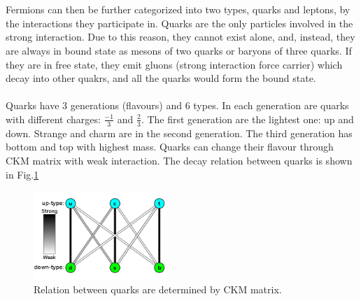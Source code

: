 \\ 
\\Fermions can then be further categorized into two types, quarks and leptons, by the interactions they participate in. Quarks are the only particles involved in the strong interaction. Due to this reason, they cannot exist alone, and, instead, they are always in bound state as mesons of two quarks or baryons of three quarks. If they are in free state, they emit gluons (strong interaction force carrier) which  decay into other quakrs, and all the quarks would form the bound state. 
\\
\\Quarks have 3 generations (flavours) and 6 types. In each generation are quarks with different charges: $\frac{-1}{3}$ and $\frac{2}{3}$. The first generation are the lightest one: up and down. Strange and charm are in the second generation. The third generation has bottom and top with highest mass. Quarks can change their flavour through CKM matrix with weak interaction. The decay relation between quarks is shown in Fig.\ref{Fig:quarks}
\\    
\begin{figure}[!h]                
	\includegraphics[width=0.45\textwidth]{Chapter1/quarks.png}
	\centering
	\begin{center}
		\caption{Relation between quarks are determined by CKM matrix.}
		\label{Fig:quarks}            
	\end{center}
\end{figure}

